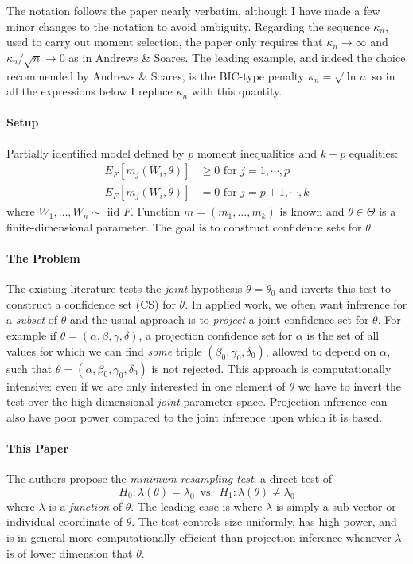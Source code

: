 \documentclass[12pt]{article}
\begin{document}
The notation follows the paper nearly verbatim, although I have made a few minor changes to the notation to avoid ambiguity.
Regarding the sequence $\kappa_n$, used to carry out moment selection, the paper only requires that $\kappa_n \rightarrow \infty$ and $\kappa_n/\sqrt{n} \rightarrow 0$ as in Andrews \& Soares.
The leading example, and indeed the choice recommended by Andrews \& Soares, is the BIC-type penalty $\kappa_n = \sqrt{\ln n}$ so in all the expressions below I replace $\kappa_n$ with this quantity.

\paragraph{Setup} Partially identified model defined by $p$ moment  inequalities and $k - p$ equalities:
\begin{align*}
  E_F\left[ m_j(W_i,\theta) \right] &\geq 0 \mbox{ for } j = 1, \cdots, p\\
  E_F\left[ m_j(W_i,\theta) \right] &= 0 \mbox{ for } j = p+1, \cdots, k
\end{align*}
where $W_1, \hdots, W_n \sim \mbox{ iid } F$.
Function $m = (m_1, \hdots, m_k)$ is known and $\theta \in \Theta$ is a finite-dimensional parameter.
The goal is to construct confidence sets for $\theta$.


\paragraph{The Problem} 
The existing literature tests the \emph{joint} hypothesis $\theta = \theta_0$ and inverts this test to construct a confidence set (CS) for $\theta$.
In applied work, we often want inference for a \emph{subset} of $\theta$ and the usual approach is to \emph{project} a joint confidence set for $\theta$.
For example if $\theta = (\alpha, \beta, \gamma, \delta)$, a projection confidence set for $\alpha$ is the set of all values for which we can find \emph{some} triple $(\beta_0, \gamma_0, \delta_0)$, allowed to depend on $\alpha$,  such that $\theta = (\alpha, \beta_0, \gamma_0, \delta_0)$ is not rejected.
This approach is computationally intensive: even if we are only interested in one element of $\theta$ we have to invert the test over the high-dimensional \emph{joint} parameter space.
Projection inference can also have poor power compared to the joint inference upon which it is based.

\paragraph{This Paper} 
The authors propose the \emph{minimum resampling test}: a direct test of
\[
  H_0\colon \lambda(\theta) = \lambda_0 \, \mbox{ vs. } \, H_1\colon \lambda(\theta) \neq \lambda_0
\]
where $\lambda$ is a \emph{function} of $\theta$.
The leading case is where $\lambda$ is simply a sub-vector or individual coordinate of $\theta$.
The test controls size uniformly, has high power, and is in general more computationally efficient than projection inference whenever $\lambda$ is of lower dimension that $\theta$. 
\end{document}

